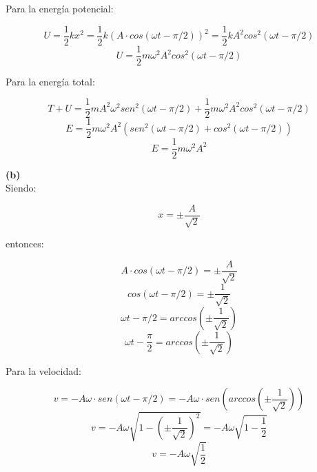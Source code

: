 \documentclass[letter,11pt]{article}
\begin{document}
Para la energía potencial:

\begin{equation*}
    U = \frac{1}{2} k x^2 = \frac{1}{2} k ( A \cdot cos(\omega t - \pi / 2))^2 = \frac{1}{2} k A^2 cos^2(\omega t - \pi / 2)
\end{equation*}
\begin{equation}
    U = \frac{1}{2} m \omega^2 A^2 cos^2(\omega t - \pi / 2)
\end{equation}

Para la energía total:

\begin{equation*}
    T + U = \frac{1}{2} m A^2 \omega^2 sen^2(\omega t - \pi/2) + \frac{1}{2} m \omega^2 A^2 cos^2(\omega t - \pi / 2)
\end{equation*}
\begin{equation*}
    E = \frac{1}{2} m \omega^2 A^2 (sen^2(\omega t - \pi/2) + cos^2(\omega t - \pi/2))
\end{equation*}
\begin{equation}
    E = \frac{1}{2} m \omega^2 A^2
\end{equation}

\textbf{(b)} \\

Siendo: 

\begin{equation}
    x = \pm \frac{A}{\sqrt{2}}
\end{equation}

entonces:

\begin{equation*}
    A \cdot cos(\omega t - \pi/2) = \pm \frac{A}{\sqrt{2}}
\end{equation*}
\begin{equation*}
    cos(\omega t - \pi/2) = \pm \frac{1}{\sqrt{2}}
\end{equation*}
\begin{equation*}
    \omega t - \pi/2 = arccos \left( \pm \frac{1}{\sqrt{2}} \right)
\end{equation*}
\begin{equation*}
    \omega t - \frac{\pi}{2} = arccos \left( \pm \frac{1}{\sqrt{2}} \right)
\end{equation*}

Para la velocidad:

\begin{equation*}
    v = -A \omega \cdot sen(\omega t - \pi/2) = -A \omega \cdot sen\left(arccos\left(\pm \frac{1}{\sqrt{2}}\right)\right)
\end{equation*}
\begin{equation*}
    v = -A \omega \sqrt{1 - \left(\pm \frac{1}{\sqrt{2}}\right)^2} = -A \omega \sqrt{1 - \frac{1}{2}}
\end{equation*}
\begin{equation}
    v = -A \omega \sqrt{\frac{1}{2}}
\end{equation}
\end{document}

